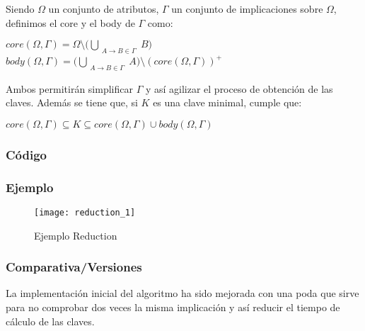 Siendo \(\Omega\) un conjunto de atributos, \(\Gamma\) un conjunto de implicaciones sobre \(\Omega\), definimos el core y el body de \(\Gamma\) como:
\begin{center}
    \(core(\Omega,\Gamma) = \Omega \setminus \big(\bigcup_{\substack{A \to B \in \Gamma}} B\big) \ \ \ \ \)
    \(body(\Omega,\Gamma) = \big(\bigcup_{\substack{A \to B \in \Gamma}} A\big) \setminus (core(\Omega,\Gamma))^+\)
\end{center}
Ambos permitir\'an simplificar \(\Gamma\) y as\'i agilizar el proceso de obtenci\'on de las claves. Adem\'as se tiene que, si \(K\) es una clave minimal, cumple que: 
\begin{center}
    \(core(\Omega,\Gamma) \subseteq K \subseteq core(\Omega,\Gamma) \cup body(\Omega,\Gamma)\)
\end{center}
\newpage
\subsubsection{C\'odigo} 

\newpage
\subsubsection{Ejemplo} 
\begin{figure}[H]
    \centering
    \texttt{[image: reduction\_1]}
    \caption{Ejemplo Reduction}
    \label{fig:reduction_1}
\end{figure}
\subsubsection{Comparativa/Versiones} 
La implementaci\'on inicial del algoritmo ha sido mejorada con una poda que sirve para no comprobar dos veces la misma implicaci\'on y as\'i reducir el tiempo de c\'alculo de las claves.